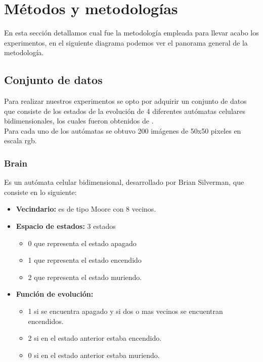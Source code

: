 \chapter{Métodos y metodologías}

En esta sección detallamos cual fue la metodología empleada para llevar acabo los experimentos, en el siguiente diagrama podemos ver el panorama general de la metodología.


\section{Conjunto de datos}

Para realizar nuestros experimentos se opto por adquirir un conjunto de datos que consiste de los estados de la evolución de 4 diferentes autómatas celulares bidimensionales, los cuales fueron obtenidos de \cite{rucker_walker}.
\\
Para cada uno de los autómatas se obtuvo 200 imágenes de 50x50 pixeles en escala rgb.

\subsection{Brain}

Es un autómata celular bidimensional, desarrollado por Brian Silverman, que consiste en lo siguiente:

\begin{itemize}
	\item \textbf{Vecindario:} es de tipo Moore con 8 vecinos.
	\item \textbf{Espacio de estados:} 3 estados
		\begin{itemize}
			\item 0 que representa el estado apagado
			\item 1 que representa el estado encendido
			\item 2 que representa el estado muriendo.
		\end{itemize}
	\item \textbf{Función de evolución:} 
		\begin{itemize}
			\item 1 si se encuentra apagado y si dos o mas vecinos se encuentran encendidos.
			\item 2 si en el estado anterior estaba encendido.
			\item 0 si en el estado anterior estaba muriendo.
		\end{itemize}
\end{itemize}

